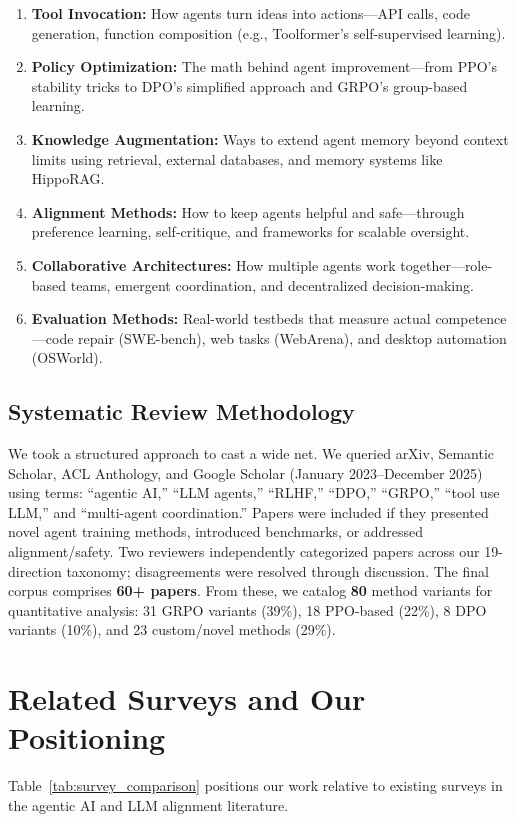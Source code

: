 \documentclass[12pt,a4paper]{report}
\theoremstyle{definition}
\newcommand{\methodN}{80}
\begin{document}
\begin{enumerate}
    \item \textbf{Tool Invocation:} How agents turn ideas into actions---API calls, code generation, function composition (e.g., Toolformer's self-supervised learning).
    \item \textbf{Policy Optimization:} The math behind agent improvement---from PPO's stability tricks to DPO's simplified approach and GRPO's group-based learning.
    \item \textbf{Knowledge Augmentation:} Ways to extend agent memory beyond context limits using retrieval, external databases, and memory systems like HippoRAG.
    \item \textbf{Alignment Methods:} How to keep agents helpful and safe---through preference learning, self-critique, and frameworks for scalable oversight.
    \item \textbf{Collaborative Architectures:} How multiple agents work together---role-based teams, emergent coordination, and decentralized decision-making.
    \item \textbf{Evaluation Methods:} Real-world testbeds that measure actual competence---code repair (SWE-bench), web tasks (WebArena), and desktop automation (OSWorld).
\end{enumerate}

\subsection{Systematic Review Methodology}
We took a structured approach to cast a wide net. We queried arXiv, Semantic Scholar, ACL Anthology, and Google Scholar (January 2023--December 2025) using terms: ``agentic AI,'' ``LLM agents,'' ``RLHF,'' ``DPO,'' ``GRPO,'' ``tool use LLM,'' and ``multi-agent coordination.'' Papers were included if they presented novel agent training methods, introduced benchmarks, or addressed alignment/safety. Two reviewers independently categorized papers across our 19-direction taxonomy; disagreements were resolved through discussion. The final corpus comprises \textbf{60+ papers}. From these, we catalog \textbf{\methodN} method variants for quantitative analysis: 31 GRPO variants (39\%), 18 PPO-based (22\%), 8 DPO variants (10\%), and 23 custom/novel methods (29\%).

\section{Related Surveys and Our Positioning}
Table~\ref{tab:survey_comparison} positions our work relative to existing surveys in the agentic AI and LLM alignment literature.
\end{document}
